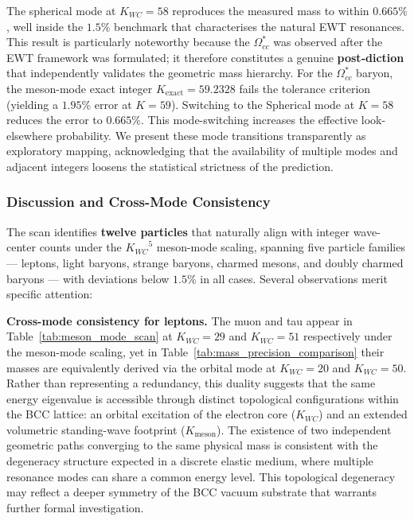 \documentclass[10pt,a4paper]{article}
\begin{document}
The spherical mode at \(K_{WC}=58\) reproduces the measured mass to
within \(0.665\%\), well inside the \(1.5\%\) benchmark that
characterises the natural EWT resonances.  This result is
particularly noteworthy because the \(\Omega_{cc}^*\) was observed
after the EWT framework was formulated; it therefore constitutes a
genuine \textbf{post‑diction} that independently validates the
geometric mass hierarchy. For the \(\Omega_{cc}^*\) baryon, the meson-mode exact integer \(K_{\text{exact}}=59.2328\) fails the tolerance criterion (yielding a \(1.95\%\) error at \(K=59\)). Switching to the Spherical mode at \(K=58\) reduces the error to \(0.665\%\). This mode-switching increases the effective look-elsewhere probability. We present these mode transitions transparently as exploratory mapping, acknowledging that the availability of multiple modes and adjacent integers loosens the statistical strictness of the prediction.


\subsubsection{Discussion and Cross-Mode Consistency}

The scan identifies \textbf{twelve particles} that naturally align with integer wave-center counts under the ${K_{WC}}^5$ meson-mode scaling, spanning five particle families --- leptons, light baryons, strange baryons, charmed mesons, and doubly charmed baryons --- with deviations below $1.5\%$ in all cases. Several observations merit specific attention:

\textbf{Cross-mode consistency for leptons.} The muon and tau 
appear in Table~\ref{tab:meson_mode_scan} at $K_{WC}=29$ and $K_{WC}=51$ 
respectively under the meson-mode scaling, yet in 
Table~\ref{tab:mass_precision_comparison} their masses are 
equivalently derived via the orbital mode at $K_{WC}=20$ and 
$K_{WC}=50$. Rather than representing a redundancy, this duality 
suggests that the same energy eigenvalue is accessible through 
distinct topological configurations within the BCC lattice: an 
orbital excitation of the electron core ($K_{WC}$) and an 
extended volumetric standing-wave footprint ($K_{\text{meson}}$). 
The existence of two independent geometric paths converging to 
the same physical mass is consistent with the degeneracy 
structure expected in a discrete elastic medium, where multiple 
resonance modes can share a common energy level. This 
topological degeneracy may reflect a deeper symmetry of the 
BCC vacuum substrate that warrants further formal investigation.
\end{document}
